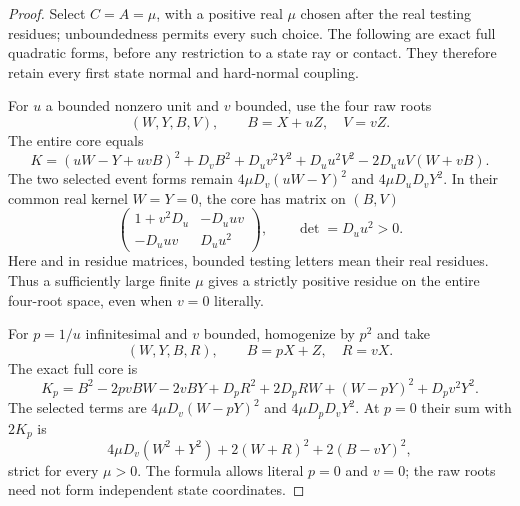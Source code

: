 \begin{proof}
Select $C=A=\mu$, with a positive real $\mu$ chosen after the real testing
residues; unboundedness permits every such choice. The following are exact
full quadratic forms, before any restriction to a state ray or contact.
They therefore retain every first state normal and hard-normal coupling.

For $u$ a bounded nonzero unit and $v$ bounded, use the four raw roots
\[
 (W,Y,B,V),\qquad B=X+uZ,\quad V=vZ.
\]
The entire core equals
\[
 K=(uW-Y+uvB)^2+D_vB^2+D_uv^2Y^2+D_uu^2V^2
       -2D_uuV(W+vB).                         \tag{CE2}
\]
The two selected event forms remain $4\mu D_v(uW-Y)^2$ and
$4\mu D_uD_vY^2$. In their common real kernel $W=Y=0$, the core has
matrix on $(B,V)$
\[
 \begin{pmatrix}1+v^2D_u&-D_uuv\\-D_uuv&D_uu^2\end{pmatrix},
 \qquad \det=D_uu^2>0.                       \tag{CE3}
\]
Here and in residue matrices, bounded testing letters mean their real
residues. Thus a sufficiently large finite $\mu$ gives a strictly positive
residue on the entire four-root space, even when $v=0$ literally.

For $p=1/u$ infinitesimal and $v$ bounded, homogenize by $p^2$ and take
\[
 (W,Y,B,R),\qquad B=pX+Z,\quad R=vX.
\]
The exact full core is
\[
 K_p=B^2-2pvBW-2vBY+D_pR^2+2D_pRW
                  +(W-pY)^2+D_pv^2Y^2.       \tag{CE4}
\]
The selected terms are $4\mu D_v(W-pY)^2$ and
$4\mu D_pD_vY^2$. At $p=0$ their sum with $2K_p$ is
\[
 4\mu D_v(W^2+Y^2)+2(W+R)^2+2(B-vY)^2,       \tag{CE5}
\]
strict for every $\mu>0$. The formula allows literal $p=0$ and $v=0$;
the raw roots need not form independent state coordinates.


\end{proof}
